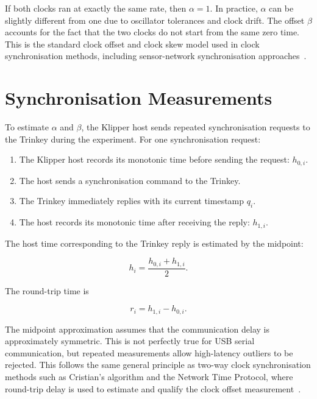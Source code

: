 \documentclass[11pt,a4paper]{article}
\begin{document}
If both clocks ran at exactly the same rate, then \(\alpha = 1\). In practice,
\(\alpha\) can be slightly different from one due to oscillator tolerances and
clock drift. The offset \(\beta\) accounts for the fact that the two clocks do
not start from the same zero time. This is the standard clock offset and clock
skew model used in clock synchronisation methods, including sensor-network
synchronisation approaches~\cite{elson2002rbs}.

\section{Synchronisation Measurements}

To estimate \(\alpha\) and \(\beta\), the Klipper host sends repeated
synchronisation requests to the Trinkey during the experiment. For one
synchronisation request:

\begin{enumerate}
    \item The Klipper host records its monotonic time before sending the request:
    \(h_{0,i}\).
    \item The host sends a synchronisation command to the Trinkey.
    \item The Trinkey immediately replies with its current timestamp
    \(q_i\).
    \item The host records its monotonic time after receiving the reply:
    \(h_{1,i}\).
\end{enumerate}

The host time corresponding to the Trinkey reply is estimated by the midpoint:

\begin{equation}
    h_i = \frac{h_{0,i} + h_{1,i}}{2}.
    \label{eq:midpoint}
\end{equation}

The round-trip time is

\begin{equation}
    r_i = h_{1,i} - h_{0,i}.
\end{equation}

The midpoint approximation assumes that the communication delay is approximately
symmetric. This is not perfectly true for USB serial communication, but repeated
measurements allow high-latency outliers to be rejected. This follows the same
general principle as two-way clock synchronisation methods such as Cristian's
algorithm and the Network Time Protocol, where round-trip delay is used to
estimate and qualify the clock offset measurement~\cite{cristian1989probabilistic,mills2010ntp}.
\end{document}
